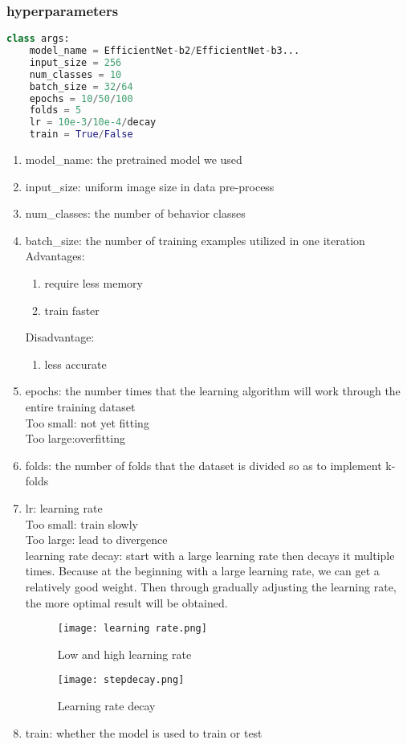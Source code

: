 \documentclass[final]{cvpr}
\begin{document}
    
    \subsubsection{hyperparameters}
    \begin{lstlisting}[language=python]
    class args:
    model_name = EfficientNet-b2/EfficientNet-b3...
    input_size = 256
    num_classes = 10
    batch_size = 32/64
    epochs = 10/50/100
    folds = 5
    lr = 10e-3/10e-4/decay
    train = True/False
    \end{lstlisting}
    
    \begin{enumerate}
    \item model\_name: the pretrained model we used
    \item input\_size: uniform image size in data pre-process
    \item num\_classes: the number of behavior classes
    \item batch\_size:  the number of training examples utilized in one iteration \\    
    Advantages:
    \begin{enumerate}
        \item require less memory
        \item train faster
    \end{enumerate}
    Disadvantage:
    \begin{enumerate}
        \item less accurate
    \end{enumerate}
    \item epochs: the number times that the learning algorithm will work through the entire training dataset \\
    Too small: not yet fitting \\
    Too large:overfitting
    \item folds: the number of folds that the dataset is divided so as to implement k-folds
    \item lr: learning rate \\
    Too small: train slowly \\
    Too large: lead to divergence \\
    learning rate decay: start with a large learning rate then decays it multiple times. Because at the beginning with a large learning rate, we can get a relatively good weight. Then through gradually adjusting the learning rate, the more optimal result will be obtained.
    \begin{figure}[htbp]
        \centering
        \texttt{[image: learning rate.png]}
        \caption{Low and high learning rate}
    \end{figure}
    \begin{figure}[htbp]
        \centering
        \texttt{[image: stepdecay.png]}
        \caption{Learning rate decay}
    \end{figure}
    \item train: whether the model is used to train or test
    \end{enumerate}
\end{document}

